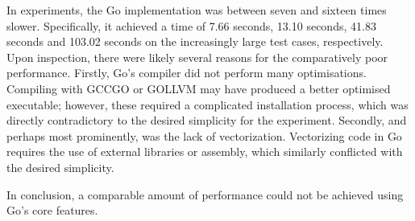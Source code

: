 \documentclass[twocolumn, a4paper]{article}
\begin{document}
In experiments, the Go implementation was between seven and sixteen times slower.
Specifically, it achieved a time of 7.66 seconds, 13.10 seconds, 41.83 seconds and 103.02 seconds on the increasingly large test cases, respectively.
Upon inspection, there were likely several reasons for the comparatively poor performance.
Firstly, Go's compiler did not perform many optimisations.
Compiling with GCCGO or GOLLVM may have produced a better optimised executable; however, these required a complicated installation process, which was directly contradictory to the desired simplicity for the experiment.
Secondly, and perhaps most prominently, was the lack of vectorization.
Vectorizing code in Go requires the use of external libraries or assembly, which similarly conflicted with the desired simplicity.

In conclusion, a comparable amount of performance could not be achieved using Go's core features.

\clearpage

\onecolumn{
  \printbibliography
}
\end{document}
